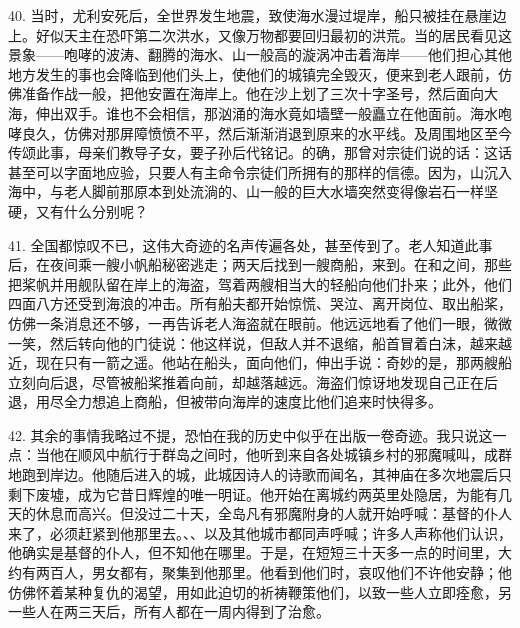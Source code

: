 40. 当时，尤利安死后，全世界发生地震，致使海水漫过堤岸，船只被挂在悬崖边上。好似天主在恐吓第二次洪水，又像万物都要回归最初的洪荒。当的居民看见这景象——咆哮的波涛、翻腾的海水、山一般高的漩涡冲击着海岸——他们担心其他地方发生的事也会降临到他们头上，使他们的城镇完全毁灭，便来到老人跟前，仿佛准备作战一般，把他安置在海岸上。他在沙上划了三次十字圣号，然后面向大海，伸出双手。谁也不会相信，那汹涌的海水竟如墙壁一般矗立在他面前。海水咆哮良久，仿佛对那屏障愤愤不平，然后渐渐消退到原来的水平线。及周围地区至今传颂此事，母亲们教导子女，要子孙后代铭记。的确，那曾对宗徒们说的话：这话甚至可以字面地应验，只要人有主命令宗徒们所拥有的那样的信德。因为，山沉入海中，与老人脚前那原本到处流淌的、山一般的巨大水墙突然变得像岩石一样坚硬，又有什么分别呢？\par

41. 全国都惊叹不已，这伟大奇迹的名声传遍各处，甚至传到了。老人知道此事后，在夜间乘一艘小帆船秘密逃走；两天后找到一艘商船，来到。在和之间，那些把桨帆并用舰队留在岸上的海盗，驾着两艘相当大的轻船向他们扑来；此外，他们四面八方还受到海浪的冲击。所有船夫都开始惊慌、哭泣、离开岗位、取出船桨，仿佛一条消息还不够，一再告诉老人海盗就在眼前。他远远地看了他们一眼，微微一笑，然后转向他的门徒说：他这样说，但敌人并不退缩，船首冒着白沫，越来越近，现在只有一箭之遥。他站在船头，面向他们，伸出手说：奇妙的是，那两艘船立刻向后退，尽管被船桨推着向前，却越落越远。海盗们惊讶地发现自己正在后退，用尽全力想追上商船，但被带向海岸的速度比他们追来时快得多。\par

42. 其余的事情我略过不提，恐怕在我的历史中似乎在出版一卷奇迹。我只说这一点：当他在顺风中航行于群岛之间时，他听到来自各处城镇乡村的邪魔喊叫，成群地跑到岸边。他随后进入的城，此城因诗人的诗歌而闻名，其神庙在多次地震后只剩下废墟，成为它昔日辉煌的唯一明证。他开始在离城约两英里处隐居，为能有几天的休息而高兴。但没过二十天，全岛凡有邪魔附身的人就开始呼喊：基督的仆人来了，必须赶紧到他那里去。、、以及其他城市都同声呼喊；许多人声称他们认识，他确实是基督的仆人，但不知他在哪里。于是，在短短三十天多一点的时间里，大约有两百人，男女都有，聚集到他那里。他看到他们时，哀叹他们不许他安静；他仿佛怀着某种复仇的渴望，用如此迫切的祈祷鞭策他们，以致一些人立即痊愈，另一些人在两三天后，所有人都在一周内得到了治愈。\par

